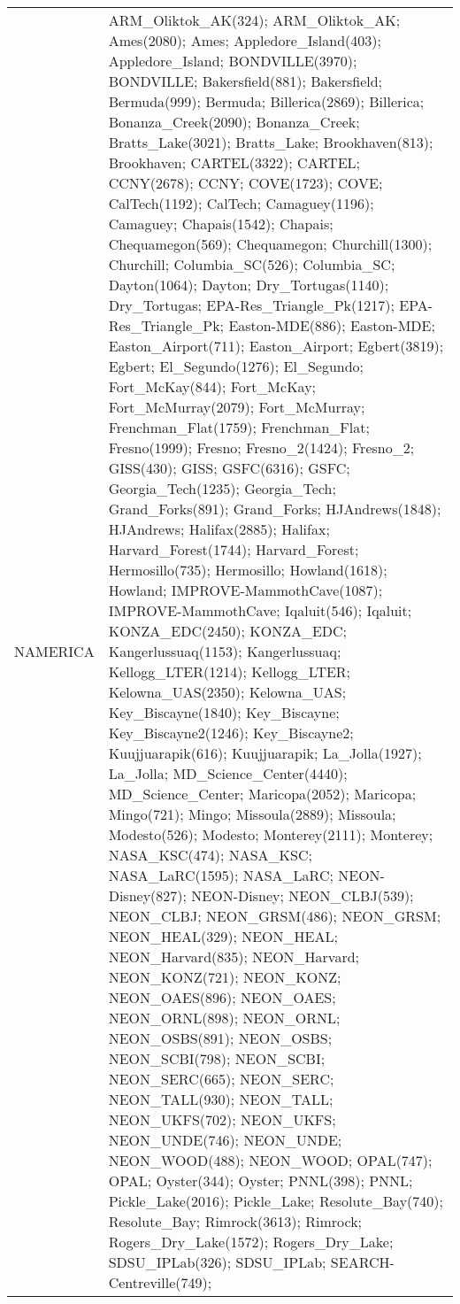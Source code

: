 \documentclass[journal abbreviation, manuscript]{copernicus}
\begin{document}
\begin{table}
\begin{tabularx}{\textwidth}{lX}
                                                                                                                                                                                                                                                                                                                                                                                                                                                                                                                                                                                                                                                                                                                                                                                        \\
  NAMERICA  & ARM\_Oliktok\_AK(324); ARM\_Oliktok\_AK; Ames(2080); Ames; Appledore\_Island(403); Appledore\_Island; BONDVILLE(3970); BONDVILLE; Bakersfield(881); Bakersfield; Bermuda(999); Bermuda; Billerica(2869); Billerica; Bonanza\_Creek(2090); Bonanza\_Creek; Bratts\_Lake(3021); Bratts\_Lake; Brookhaven(813); Brookhaven; CARTEL(3322); CARTEL; CCNY(2678); CCNY; COVE(1723); COVE; CalTech(1192); CalTech; Camaguey(1196); Camaguey; Chapais(1542); Chapais; Chequamegon(569); Chequamegon; Churchill(1300); Churchill; Columbia\_SC(526); Columbia\_SC; Dayton(1064); Dayton; Dry\_Tortugas(1140); Dry\_Tortugas; EPA-Res\_Triangle\_Pk(1217); EPA-Res\_Triangle\_Pk; Easton-MDE(886); Easton-MDE; Easton\_Airport(711); Easton\_Airport; Egbert(3819); Egbert; El\_Segundo(1276); El\_Segundo; Fort\_McKay(844); Fort\_McKay; Fort\_McMurray(2079); Fort\_McMurray; Frenchman\_Flat(1759); Frenchman\_Flat; Fresno(1999); Fresno; Fresno\_2(1424); Fresno\_2; GISS(430); GISS; GSFC(6316); GSFC; Georgia\_Tech(1235); Georgia\_Tech; Grand\_Forks(891); Grand\_Forks; HJAndrews(1848); HJAndrews; Halifax(2885); Halifax; Harvard\_Forest(1744); Harvard\_Forest; Hermosillo(735); Hermosillo; Howland(1618); Howland; IMPROVE-MammothCave(1087); IMPROVE-MammothCave; Iqaluit(546); Iqaluit; KONZA\_EDC(2450); KONZA\_EDC; Kangerlussuaq(1153); Kangerlussuaq; Kellogg\_LTER(1214); Kellogg\_LTER; Kelowna\_UAS(2350); Kelowna\_UAS; Key\_Biscayne(1840); Key\_Biscayne; Key\_Biscayne2(1246); Key\_Biscayne2; Kuujjuarapik(616); Kuujjuarapik; La\_Jolla(1927); La\_Jolla; MD\_Science\_Center(4440); MD\_Science\_Center; Maricopa(2052); Maricopa; Mingo(721); Mingo; Missoula(2889); Missoula; Modesto(526); Modesto; Monterey(2111); Monterey; NASA\_KSC(474); NASA\_KSC; NASA\_LaRC(1595); NASA\_LaRC; NEON-Disney(827); NEON-Disney; NEON\_CLBJ(539); NEON\_CLBJ; NEON\_GRSM(486); NEON\_GRSM; NEON\_HEAL(329); NEON\_HEAL; NEON\_Harvard(835); NEON\_Harvard; NEON\_KONZ(721); NEON\_KONZ; NEON\_OAES(896); NEON\_OAES; NEON\_ORNL(898); NEON\_ORNL; NEON\_OSBS(891); NEON\_OSBS; NEON\_SCBI(798); NEON\_SCBI; NEON\_SERC(665); NEON\_SERC; NEON\_TALL(930); NEON\_TALL; NEON\_UKFS(702); NEON\_UKFS; NEON\_UNDE(746); NEON\_UNDE; NEON\_WOOD(488); NEON\_WOOD; OPAL(747); OPAL; Oyster(344); Oyster; PNNL(398); PNNL; Pickle\_Lake(2016); Pickle\_Lake; Resolute\_Bay(740); Resolute\_Bay; Rimrock(3613); Rimrock; Rogers\_Dry\_Lake(1572); Rogers\_Dry\_Lake; SDSU\_IPLab(326); SDSU\_IPLab; SEARCH-Centreville(749); 
\end{tabularx}
\end{table}
\end{document}
